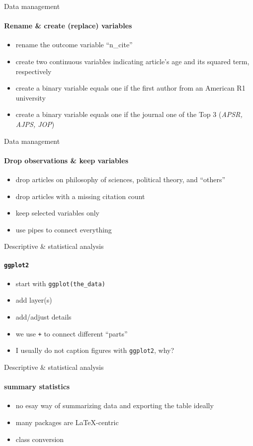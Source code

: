 \documentclass{beamer}
\begin{document}
\begin{frame}{Data management}
\framesubtitle{Rename \& create (replace) variables}
\begin{itemize}
    \item rename the outcome variable ``n\_cite''
    \item create two continuous variables indicating article's age and its squared term, respectively
    \item create a binary variable equals one if the first author from an American R1 university
    \item create a binary variable equals one if the journal one of the Top 3 (\textit{APSR, AJPS, JOP})
\end{itemize}
\end{frame}

\begin{frame}{Data management}
\framesubtitle{Drop observations \& keep variables}
\begin{itemize}
    \item drop articles on philosophy of sciences, political theory, and ``others''
    \item drop articles with a missing citation count
    \item keep selected variables only
    \item use pipes to connect everything
\end{itemize}
\end{frame}

\begin{frame}{Descriptive \& statistical analysis}
\framesubtitle{\texttt{ggplot2}}
\begin{itemize}
    \item start with \texttt{ggplot(the\_data)}
    \item add layer(s)
    \item add/adjust details
    \item we use \texttt{+} to connect different ``parts''
    \item I usually do not caption figures with \texttt{ggplot2}, why?
\end{itemize}
\end{frame}

\begin{frame}{Descriptive \& statistical analysis}
\framesubtitle{summary statistics}
\begin{itemize}
    \item no esay way of summarizing data and exporting the table ideally
    \item many packages are \LaTeX-centric
    \item class conversion
\end{itemize}
\end{frame}
\end{document}
